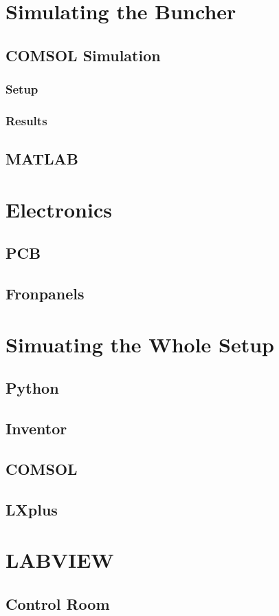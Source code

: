 \documentclass{article}
\begin{document}
\section{Simulating the Buncher}
\subsection{COMSOL Simulation}
\subsubsection{Setup}
\subsubsection{Results}
\subsection{MATLAB}


\section{Electronics}
\subsection{PCB}
\subsection{Fronpanels}


\section{Simuating the Whole Setup}

\subsection{Python}
\subsection{Inventor}
\subsection{COMSOL}
\subsection{LXplus}


\section{LABVIEW}

\subsection{Control Room}
\end{document}
